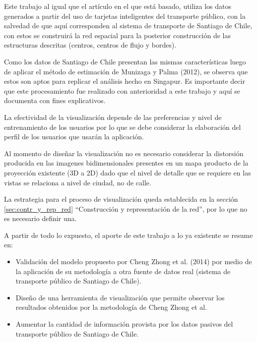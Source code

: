 \documentclass[12pt]{article}
\begin{document}
	
    Este trabajo al igual que el artículo en el que está basado, utiliza los datos generados a partir del uso de tarjetas inteligentes del transporte público, con la salvedad de que aquí corresponden al sistema de transporte de Santiago de Chile, con estos se construirá  la red espacial para la posterior construcción de las estructuras descritas (centros, centros de flujo y bordes).
	
	Como los datos de Santiago de Chile presentan las mismas características luego de aplicar el método de estimación de Munizaga y Palma (2012), se observa que estos son aptos para replicar el análisis hecho en Singapur. Es importante decir que este procesamiento fue realizado con anterioridad a este trabajo y aquí se documenta con fines explicativos.

La efectividad de la visualización depende de las preferencias  y nivel de entrenamiento de los usuarios por lo que se debe considerar la elaboración del perfil de los usuarios que usarán la aplicación. 

Al momento de diseñar la visualización no es necesario considerar la distorsión producida en las imagenes bidimensionales presentes en un mapa producto de la proyección existente (3D a 2D) dado que el nivel de detalle que se requiere en las vistas se relaciona a nivel de ciudad, no de calle. 

La estrategia para el proceso de visualización queda establecida en la sección \ref{sec:contr_y_rep_red} ``Construcción y representación de la red'', por lo que no es necesario definir una.


	A partir de todo lo expuesto, el aporte de este trabajo a lo ya existente se resume en:
	
	\begin{itemize}
	\item Validación del modelo propuesto por Cheng Zhong et al. (2014) \cite{Estructura_urbana} por medio de la aplicación de su metodología a otra fuente de datos real (sistema de transporte público de Santiago de Chile).
	\item Diseño de una herramienta de visualización que permite observar los resultados obtenidos por la metodología de Cheng Zhong et al.
	\item Aumentar la cantidad de información provista por los datos pasivos del transporte público de Santiago de Chile.
	
	\end{itemize}
	
\end{document}
